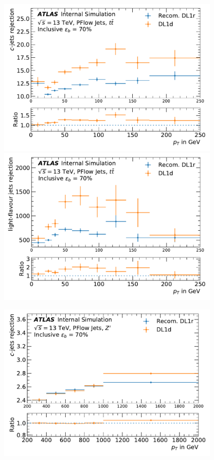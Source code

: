 \clearpage
%
\begin{center}
\begin{figure}[h!]
\vspace{-0.55cm}
\centerline{
\includegraphics[scale=0.425]{Images//FTAG/Reprocessed/plotting_eff_vs_pt/pT_vs_beff_c_tt_300.pdf}
\includegraphics[scale=0.425]{Images//FTAG/Reprocessed/plotting_eff_vs_pt/pT_vs_beff_u_tt_300.pdf}}
\centerline{
\includegraphics[scale=0.425]{Images//FTAG/Reprocessed/plotting_eff_vs_pt/pT_vs_beff_c_zp_300.pdf}
}
\end{figure}
\end{center}
